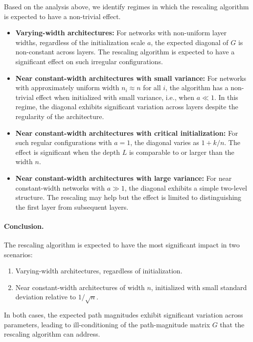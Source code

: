 \documentclass{article}
\theoremstyle{plain}
\theoremstyle{definition}
\theoremstyle{remark}
\begin{document}
Based on the analysis above, we identify regimes in which the rescaling algorithm is expected to have a non-trivial effect.
\begin{itemize}
    \item \textbf{Varying-width architectures:} For networks with non-uniform layer widths, regardless of the initialization scale $a$, the expected diagonal of $G$ is non-constant across layers. The rescaling algorithm is expected to have a significant effect on such irregular configurations.

    \item \textbf{Near constant-width architectures with small variance:} For networks with approximately uniform width $n_i \approx n$ for all $i$, the algorithm has a non-trivial effect when initialized with small variance, i.e., when $a \ll 1$. In this regime, the diagonal exhibits significant variation across layers despite the regularity of the architecture.

    \item \textbf{Near constant-width architectures with critical initialization:} For such regular configurations with $a = 1$, the diagonal varies as $1 + k/n$. The effect is significant when the depth $L$ is comparable to or larger than the width $n$.

    \item \textbf{Near constant-width architectures with large variance:} For near constant-width networks with $a \gg 1$, the diagonal exhibits a simple two-level structure. The rescaling may help but the effect is limited to distinguishing the first layer from subsequent layers.
\end{itemize}

\paragraph{Conclusion.}
The rescaling algorithm is expected to have the most significant impact in two scenarios:
\begin{enumerate}
\item Varying-width architectures, regardless of initialization.
\item Near constant-width architectures of width $n$, initialized with small standard deviation relative to $1/\sqrt{n}$.
\end{enumerate}
In both cases, the expected path magnitudes exhibit significant variation across parameters, leading to ill-conditioning of the path-magnitude matrix $G$ that the rescaling algorithm can address.
\end{document}
